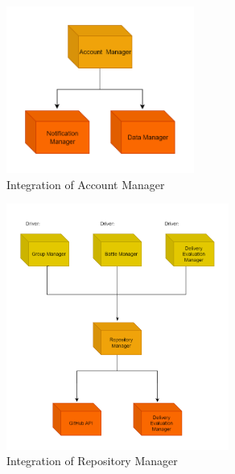 \documentclass[../DD.tex]{subfiles}
\begin{document}
        \begin{figure}[h!]
            \centering
            \hspace*{-1cm}
            \includegraphics[width=0.55\textwidth]{../assets/section_5/3.png}
            \caption{Integration of Account Manager}
        \end{figure}

        \begin{figure}[h!]
            \centering
            \hspace*{-1cm}
            \includegraphics[width=0.65\textwidth]{../assets/section_5/4.png}
            \caption{Integration of Repository Manager}
        \end{figure}
        \newpage
\end{document}
